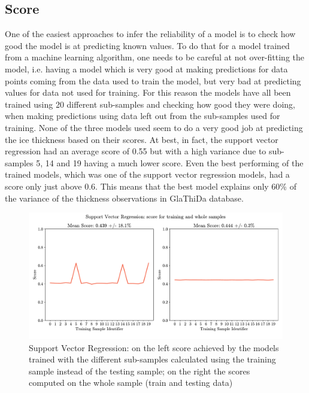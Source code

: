 \subsection{Score}\label{disc-score}

One of the easiest approaches to infer the reliability of a model is to check how good the model is at predicting known values. To do that for a model trained from a machine learning algorithm, one needs to be careful at not over-fitting the model, i.e. having a model which is very good at making predictions for data points coming from the data used to train the model, but very bad at predicting values for data not used for training. For this reason the models have all been trained using 20 different sub-samples and checking  how good they were doing, when making predictions using data left out from the sub-samples used for training.
None of the three models used seem to do a very good job at predicting the ice thickness based on their scores. At best, in fact, the support vector regression had an average score of 0.55 but with a high variance due to sub-samples 5, 14 and 19 having a much lower score. Even the best performing of the trained models, which was one of the support vector regression models, had a score only just above 0.6. This means that the best model explains only 60\% of the variance of the thickness observations in GlaThiDa database.

\begin{figure}[!tp]
	\centering		  
	\includegraphics[width=1.\textwidth]{figures/SVR_score_tr.pdf}
	\caption{Support Vector Regression: on the left score achieved by the models trained with the different sub-samples calculated using the training sample instead of the testing sample; on the right the scores computed on the whole sample (train and testing data)}
	\label{fig:train-score}
\end{figure}

